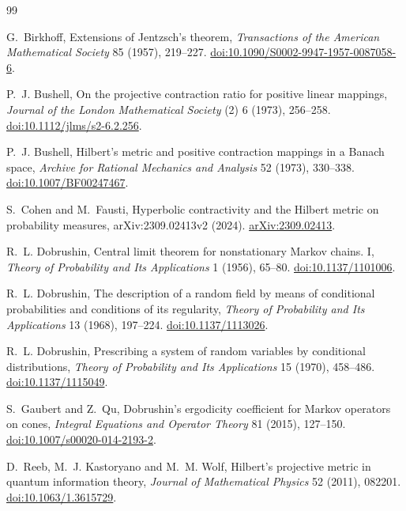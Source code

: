 \documentclass[11pt]{article}
\newcommand{\1}{\mathbf{1}}
\begin{document}
\small
\begin{thebibliography}{99}

G.~Birkhoff,
\newblock Extensions of Jentzsch's theorem,
\newblock \emph{Transactions of the American Mathematical Society} 85
(1957), 219--227.
\newblock \href{https://doi.org/10.1090/S0002-9947-1957-0087058-6}
{doi:10.1090/S0002-9947-1957-0087058-6}.

P.~J. Bushell,
\newblock On the projective contraction ratio for positive linear mappings,
\newblock \emph{Journal of the London Mathematical Society} (2) 6 (1973),
256--258.
\newblock \href{https://doi.org/10.1112/jlms/s2-6.2.256}
{doi:10.1112/jlms/s2-6.2.256}.

P.~J. Bushell,
\newblock Hilbert's metric and positive contraction mappings in a Banach
space,
\newblock \emph{Archive for Rational Mechanics and Analysis} 52 (1973),
330--338.
\newblock \href{https://doi.org/10.1007/BF00247467}
{doi:10.1007/BF00247467}.

S.~Cohen and M.~Fausti,
\newblock Hyperbolic contractivity and the Hilbert metric on probability
measures,
\newblock arXiv:2309.02413v2 (2024).
\newblock \href{https://arxiv.org/abs/2309.02413}{arXiv:2309.02413}.

R.~L. Dobrushin,
\newblock Central limit theorem for nonstationary Markov chains. I,
\newblock \emph{Theory of Probability and Its Applications} 1 (1956),
65--80.
\newblock \href{https://doi.org/10.1137/1101006}{doi:10.1137/1101006}.

R.~L. Dobrushin,
\newblock The description of a random field by means of conditional
probabilities and conditions of its regularity,
\newblock \emph{Theory of Probability and Its Applications} 13 (1968),
197--224.
\newblock \href{https://doi.org/10.1137/1113026}{doi:10.1137/1113026}.

R.~L. Dobrushin,
\newblock Prescribing a system of random variables by conditional
distributions,
\newblock \emph{Theory of Probability and Its Applications} 15 (1970),
458--486.
\newblock \href{https://doi.org/10.1137/1115049}{doi:10.1137/1115049}.

S.~Gaubert and Z.~Qu,
\newblock Dobrushin's ergodicity coefficient for Markov operators on cones,
\newblock \emph{Integral Equations and Operator Theory} 81 (2015), 127--150.
\newblock \href{https://doi.org/10.1007/s00020-014-2193-2}
{doi:10.1007/s00020-014-2193-2}.

D.~Reeb, M.~J. Kastoryano and M.~M. Wolf,
\newblock Hilbert's projective metric in quantum information theory,
\newblock \emph{Journal of Mathematical Physics} 52 (2011), 082201.
\newblock \href{https://doi.org/10.1063/1.3615729}
{doi:10.1063/1.3615729}.

\end{thebibliography}
\end{document}
